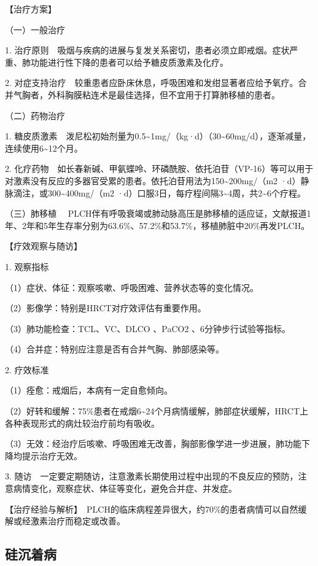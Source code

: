 【治疗方案】

{（一）一般治疗}

1.
治疗原则　吸烟与疾病的进展与复发关系密切，患者必须立即戒烟。症状严重、肺功能进行性下降的患者可以给予糖皮质激素及化疗。

2.
对症支持治疗　较重患者应卧床休息，呼吸困难和发绀显著者应给予氧疗。合并气胸者，外科胸膜粘连术是最佳选择，但不宜用于打算肺移植的患者。

{（二）药物治疗}

1.
糖皮质激素　泼尼松初始剂量为0.5\textasciitilde{}1mg/（kg·d）（30\textasciitilde{}60mg/d），逐渐减量，连续使用6\textasciitilde{}12个月。

2.
化疗药物　如长春新碱、甲氨蝶呤、环磷酰胺、依托泊苷（VP-16）等可以用于对激素没有反应的多器官受累的患者。依托泊苷用法为150\textasciitilde{}200mg/（m{2}
·d）静脉滴注，或300\textasciitilde{}400mg/（m{2}
·d）口服3日，每疗程间隔3\textasciitilde{}4周，共2\textasciitilde{}6个疗程。

{（三）肺移植}
　PLCH伴有呼吸衰竭或肺动脉高压是肺移植的适应证，文献报道1年、2年和5年生存率分别为63.6\%、57.2\%和53.7\%，移植肺脏中20\%再发PLCH。

【疗效观察与随访】

1. 观察指标

（1）症状、体征：观察咳嗽、呼吸困难、营养状态等的变化情况。

（2）影像学：特别是HRCT对疗效评估有重要作用。

（3）肺功能检查：TCL、VC、DL{CO} 、PaCO{2} 、6分钟步行试验等指标。

（4）合并症：特别应注意是否有合并气胸、肺部感染等。

2. 疗效标准

（1）痊愈：戒烟后，本病有一定自愈倾向。

（2）好转和缓解：75\%患者在戒烟6\textasciitilde{}24个月病情缓解，肺部症状缓解，HRCT上各种表现形式的病灶较治疗前均有吸收。

（3）无效：经治疗后咳嗽、呼吸困难无改善，胸部影像学进一步进展，肺功能下降均提示治疗无效。

3.
随访　一定要定期随访，注意激素长期使用过程中出现的不良反应的预防，注意病情变化，观察症状、体征等变化，避免合并症、并发症。

【治疗经验与解析】　PLCH的临床病程差异很大，约70\%的患者病情可以自然缓解或经激素治疗而稳定或改善。

\subsection{硅沉着病}

